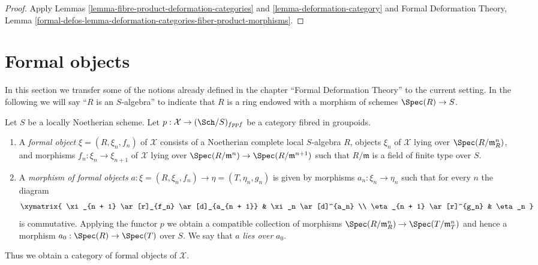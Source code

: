 \begin{proof}
Apply Lemmas \ref{lemma-fibre-product-deformation-categories} and
\ref{lemma-deformation-category}
and Formal Deformation Theory, Lemma
\ref{formal-defos-lemma-deformation-categories-fiber-product-morphisms}.
\end{proof}






\section{Formal objects}
\label{section-formal-objects}

\noindent
In this section we transfer some of the notions already defined
in the chapter ``Formal Deformation Theory'' to the current setting.
In the following we will say ``$R$ is an $S$-algebra'' to indicate
that $R$ is a ring endowed with a morphism of schemes $\Spec(R) \to S$.

\begin{definition}
\label{definition-formal-objects}
Let $S$ be a locally Noetherian scheme. Let
$p : \mathcal{X} \to (\Sch/S)_{fppf}$ be a category fibred in groupoids.
\begin{enumerate}
\item A {\it formal object} $\xi = (R, \xi_n, f_n)$ of $\mathcal{X}$ consists
of a Noetherian complete local $S$-algebra $R$, objects $\xi_n$ of
$\mathcal{X}$ lying over $\Spec(R/\mathfrak m_R^n)$, and morphisms
$f_n : \xi_n \to \xi_{n + 1}$ of $\mathcal{X}$ lying over
$\Spec(R/\mathfrak m^n) \to \Spec(R/\mathfrak m^{n + 1})$
such that $R/\mathfrak m$ is a field of finite type over $S$.
\item A {\it morphism of formal objects}
$a : \xi = (R, \xi_n, f_n) \to \eta = (T, \eta_n, g_n)$
is given by morphisms $a_n : \xi_n \to \eta_n$ such that for every $n$
the diagram
$$
\xymatrix{
\xi_{n + 1} \ar[r]_{f_n} \ar[d]_{a_{n + 1}} & \xi_n \ar[d]^{a_n} \\
\eta_{n + 1} \ar[r]^{g_n} & \eta_n
}
$$
is commutative. Applying the functor $p$ we obtain a compatible collection
of morphisms $\Spec(R/\mathfrak m_R^n) \to \Spec(T/\mathfrak m_T^n)$ and
hence a morphism $a_0 : \Spec(R) \to \Spec(T)$ over $S$. We say that
$a$ {\it lies over} $a_0$.
\end{enumerate}
\end{definition}

\noindent
Thus we obtain a category of formal objects of $\mathcal{X}$.

